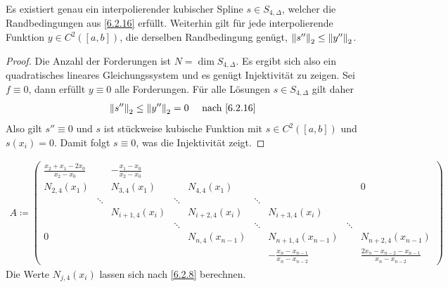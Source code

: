 \begin{Kore}\label{6.2.17}
  Es existiert genau ein interpolierender kubischer Spline 
  $s\in S_{4,\Delta}$, welcher die Randbedingungen aus \ref{6.2.16}
  erfüllt.
  Weiterhin gilt für jede interpolierende Funktion $y\in C^2([a,b])$,
  die derselben Randbedingung genügt,
  $\nn[s'']_2 \leq \nn[y'']_2$.
  \begin{proof}
    Die Anzahl der Forderungen ist $N=\dim S_{4,\Delta}$.
    Es ergibt sich also ein quadratisches lineares Gleichungssystem
    und es genügt Injektivität zu zeigen.
    Sei $f\equiv 0$, dann erfüllt $y\equiv 0$ alle Forderungen.
    Für alle Lösungen $s\in S_{4,\Delta}$ gilt daher
    \begin{gather*}
      \nn[s'']_2\leq \nn[y'']_2 =0 \quad \text{ nach \ref{6.2.16}}
    \end{gather*}
    Also gilt $s''\equiv 0$ und $s$ ist stückweise kubische Funktion
    mit $s\in C^2([a,b])$  und $s(x_i)=0$.
    Damit folgt $s\equiv 0$, was die Injektivität zeigt.
  \end{proof}
\end{Kore}



\label{5.2.18}
\begin{gather*}
  A \coloneqq 
  \left(
    \begin{array}{ccccccccc}
      \frac{x_2+x_1-2x_0}{x_2-x_0}
      & & -\frac{x_1-x_0}{x_2-x_0}& && & & & \\
      N_{2,4}(x_1)&&N_{3,4}(x_1) &&N_{4,4}(x_1)  & &&&0 \\
      &\ddots & &\ddots& &\ddots &  &&\\
      & & N_{i+1,4}(x_i)&& N_{i+2,4}(x_i) && N_{i+3,4}(x_i) && \\
      & &  &\ddots& &\ddots &&\ddots  &\\
      0&&&  &N_{n,4}(x_{n-1}) &&N_{n+1,4}(x_{n-1}) &&N_{n+2,4}(x_{n-1}) \\
      & & && && -\frac{x_n-x_{n-1}}{x_n-x_{n-2}} 
                                       && \frac{2x_n-x_{n-2}-x_{n-1}}{x_n-x_{n-2}}
    \end{array}
  \right)
\end{gather*}
Die Werte $N_{j,4}(x_i)$ lassen sich nach \ref{6.2.8} berechnen.

